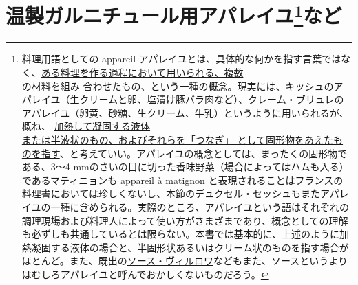 \href{未、原文対照チェック}{} \href{未、日本語表現校正}{}
\href{未、その他修正}{} \href{未、原稿最終校正}{}

\hypertarget{serie-des-appareiles-et-preparations-diverses-pour-garnitures-chaudes}{%
\section[温製ガルニチュール用アパレイユなど]{\texorpdfstring{温製ガルニチュール用アパレイユ\footnote{料理用語としての
  appareil
  アパレイユとは、具体的な何かを指す言葉ではなく、\ul{ある料理を作る過程において用いられる、複数\\の材料を組み
  合わせたもの}、という一種の概念。現実には、キッシュのアパレイユ（生クリームと卵、塩漬け豚バラ肉など）、クレーム・ブリュレのアパレイユ（卵黄、砂糖、生クリーム、牛乳）というように用いられるが、概ね、
  \ul{加熱して凝固する液体\\または半液状のもの、およびそれらを「つなぎ」
  として固形物をあえたものを指す}、と考えていい。アパレイユの概念としては、まったくの固形物である、3〜4
  mmのさいの目に切った香味野菜（場合によってはハムも入る）である\protect\hyperlink{matignon}{マティニョン}も
  appareil à matignon
  と表現されることはフランスの料理書においては珍しくないし、本節の\protect\hyperlink{duxelles-seche}{デュクセル・セッシュ}もまたアパレイユの一種に含められる。実際のところ、アパレイユという語はそれぞれの調理現場および料理人によって使い方がさまざまであり、概念としての理解も必ずしも共通しているとは限らない。本書では基本的に、上述のように加熱凝固する液体の場合と、半固形状あるいはクリーム状のものを指す場合がほとんど。また、既出の\protect\hyperlink{sauce-villeroy}{ソース・ヴィルロワ}などもまた、ソースというよりはむしろアパレイユと呼んでおかしくないものだろう。}など}{温製ガルニチュール用アパレイユなど}}\label{serie-des-appareiles-et-preparations-diverses-pour-garnitures-chaudes}}


